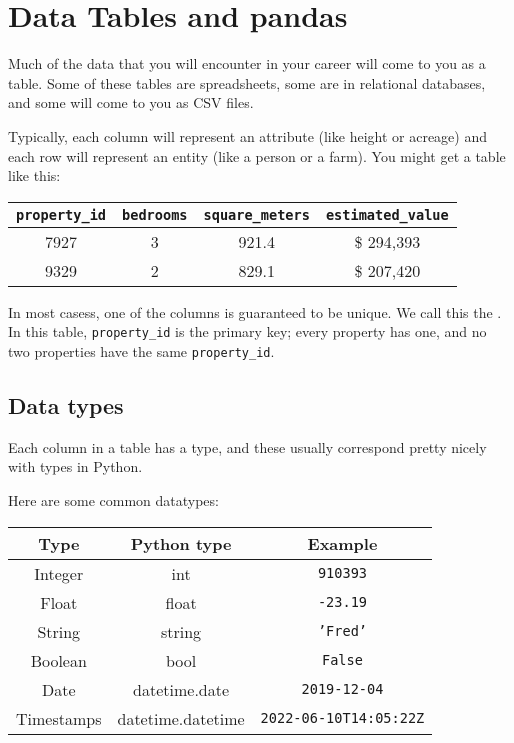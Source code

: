 \chapter{Data Tables and pandas}

Much of the data that you will encounter in your career will come to
you as a table.  Some of these tables are spreadsheets, some are in
relational databases, and some will come to you as CSV files.

Typically, each column will represent an attribute (like height or
acreage) and each row will represent an entity (like a person or a
farm). You might get a table like this:

\begin{tabular}{c | c | c | c}
  \texttt{property\_id} & \texttt{bedrooms} & \texttt{square\_meters} & \texttt{estimated\_value} \\
  \hline
  7927 &  3 & 921.4 & \$ 294,393 \\
  9329 &  2 & 829.1 & \$ 207,420 \\
\end{tabular}

In most casess, one of the columns is guaranteed to be unique. We call this
the .  In this table, \texttt{property\_id} is
the primary key; every property has one, and no two properties have
the same \texttt{property\_id}.

\section{Data types}

Each column in a table has a type, and these usually correspond pretty nicely with types in Python.

Here are some common datatypes:

\begin{tabular}{c | c | c }
  Type & Python type & Example \\
  \hline
  Integer & int & \texttt{910393} \\
  Float & float & \texttt{-23.19} \\
  String & string & \texttt{'Fred'} \\
  Boolean & bool & \texttt{False} \\
  Date & datetime.date & \texttt{2019-12-04} \\
  Timestamps & datetime.datetime & \texttt{2022-06-10T14:05:22Z} \\
\end{tabular}

